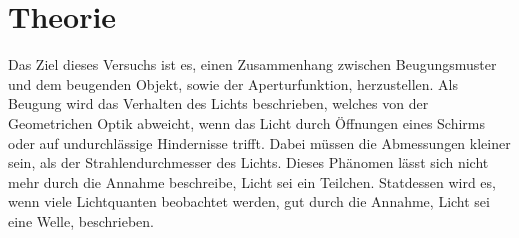 \section{Theorie}
\label{sec:Theorie}
Das Ziel dieses Versuchs ist es, einen Zusammenhang zwischen Beugungsmuster und dem beugenden Objekt, 
sowie der Aperturfunktion, herzustellen.
Als Beugung wird das Verhalten des Lichts beschrieben, welches von der Geometrichen Optik abweicht, wenn das Licht 
durch Öffnungen eines Schirms oder auf undurchlässige Hindernisse trifft. Dabei müssen die Abmessungen kleiner sein, 
als der Strahlendurchmesser des Lichts. Dieses Phänomen lässt sich nicht mehr durch die Annahme beschreibe, Licht sei ein Teilchen. 
Statdessen wird es, wenn viele Lichtquanten beobachtet werden, gut durch die Annahme, Licht sei eine Welle, beschrieben.

